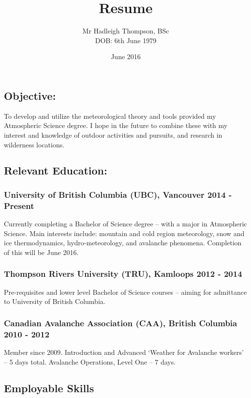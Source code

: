 \documentclass[]{article}
\title{Resume}
\author{Mr Hadleigh Thompson, BSc \\ \scriptsize{DOB: 6th June 1979}}
\date{\scriptsize{June 2016}}
\begin{document}
\maketitle

\subsection*{Objective:}  
To develop and utilize the meteorological theory and tools provided my Atmospheric Science degree. I hope in the future to combine these with my interest and knowledge of outdoor activities and pursuits, and research in wilderness locations. 

\subsection*{Relevant Education:}
\subsubsection*{University of British Columbia (UBC), Vancouver 2014 - Present}
Currently completing a Bachelor of Science degree – with a major in Atmospheric Science. Main
interests include: mountain and cold region meteorology, snow and ice thermodynamics,
hydro-meteorology, and avalanche phenomena. Completion of this will be June 2016.
\subsubsection*{Thompson Rivers University (TRU), Kamloops 2012 - 2014}
Pre-requisites and lower level Bachelor of Science courses – aiming for admittance to University of British
Columbia.
\subsubsection*{Canadian Avalanche Association (CAA), British Columbia 2010 - 2012}
Member since 2009. Introduction and Advanced ‘Weather for Avalanche workers’ – 5 days total. Avalanche Operations, Level One – 7 days.

\subsection*{Employable Skills}
\end{document}
